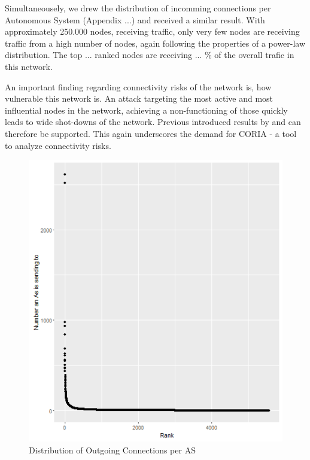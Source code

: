 \documentclass[conference, 11pt]{IEEEtran}
\begin{document}
Simultaneousely, we drew the distribution of incomming connections per Autonomous System (Appendix ...) and received a similar result. With approximately 250.000 nodes, receiving traffic, only very few nodes are receiving traffic from a high number of nodes, again following the properties of a power-law distribution. The top ... ranked nodes are receiving ... \% of the overall trafic in this network. 

An important finding regarding connectivity risks of the network is, how vulnerable this network is. An attack targeting the most active and most influential nodes in the network, achieving a non-functioning of those quickly leads to wide shot-downs of the network. Previous introduced results by \cite{powerlawCitation} and \cite{owningInternet} can therefore be supported.  This again underscores the demand for CORIA - a tool to analyze connectivity risks. 


\begin{figure}[htbp]
\centerline{\includegraphics[scale=0.4]{Graphics/AsFromDistribution.png}}
\caption{Distribution of Outgoing Connections per AS}
\label{fig}
\end{figure}
\end{document}
